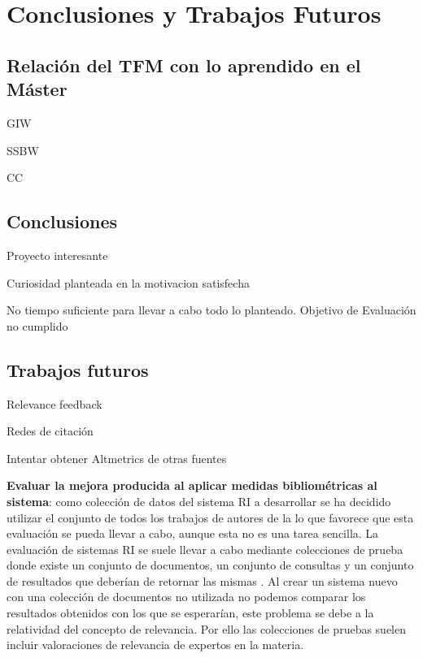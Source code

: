 \chapter{Conclusiones y Trabajos Futuros}

\section{Relación del \acrshort{TFM} con lo aprendido en el Máster}

GIW

SSBW

CC


\section{Conclusiones}

Proyecto interesante

Curiosidad planteada en la motivacion satisfecha

No tiempo suficiente para llevar a cabo todo lo planteado. Objetivo de  Evaluación no cumplido

\section{Trabajos futuros}
Relevance feedback

Redes de citación

Intentar obtener Altmetrics de otras fuentes

\textbf{Evaluar la mejora producida al aplicar medidas bibliométricas al sistema}: como colección de datos del sistema \acrshort{RI} a desarrollar se ha decidido utilizar el conjunto de todos los trabajos de autores de la \myFaculty lo que favorece que esta evaluación se pueda llevar a cabo, aunque esta no es una tarea sencilla. La evaluación de sistemas \acrshort{RI} se suele llevar a cabo mediante colecciones de prueba donde existe un conjunto de documentos, un conjunto de consultas y un conjunto de resultados que deberían de retornar las mismas  \cite{RI_Evaluation}. Al crear un sistema nuevo con una colección de documentos no utilizada no podemos comparar los resultados obtenidos con los que se esperarían, este problema se debe a la relatividad del concepto de relevancia. Por ello las colecciones de pruebas suelen incluir valoraciones de relevancia de expertos en la materia.